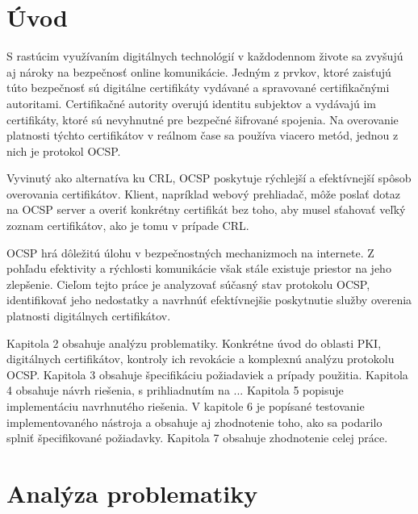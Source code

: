 \documentclass[12pt, twoside]{book}
\begin{document}
\newpage\null\thispagestyle{empty}\newpage

\newpage

\pagestyle{fancy}
\setcounter{page}{1}

\fancyhf{} 
\renewcommand{\headrulewidth}{0pt}
\fancyfoot[C]{\thepage}
\renewcommand\thesection{\arabic{section}}


\section{Úvod}

S rastúcim využívaním digitálnych technológií v každodennom živote sa zvyšujú aj nároky na bezpečnosť online komunikácie. Jedným z prvkov, ktoré zaisťujú túto bezpečnosť sú digitálne certifikáty vydávané a spravované certifikačnými autoritami. Certifikačné autority overujú identitu subjektov a vydávajú im certifikáty, ktoré sú nevyhnutné pre bezpečné šifrované spojenia. Na overovanie platnosti týchto certifikátov v reálnom čase sa používa viacero metód, jednou z nich je protokol OCSP.\cite{certs2}

Vyvinutý ako alternatíva ku CRL, OCSP poskytuje rýchlejší a efektívnejší spôsob overovania certifikátov. Klient, napríklad webový prehliadač, môže poslať dotaz na OCSP server a overiť konkrétny certifikát bez toho, aby musel sťahovať veľký zoznam certifikátov, ako je tomu v prípade CRL.\cite{certs2}

OCSP hrá dôležitú úlohu v bezpečnostných mechanizmoch na internete. Z pohľadu efektivity a rýchlosti komunikácie však stále existuje priestor na jeho zlepšenie. Cieľom tejto práce je analyzovať súčasný stav protokolu OCSP, identifikovať jeho nedostatky a navrhnúť efektívnejšie poskytnutie služby overenia platnosti digitálnych certifikátov.

Kapitola 2 obsahuje analýzu problematiky. Konkrétne úvod do oblasti PKI, digitálnych certifikátov, kontroly ich revokácie a komplexnú analýzu protokolu OCSP. 
Kapitola 3 obsahuje špecifikáciu požiadaviek a prípady použitia. 
Kapitola 4 obsahuje návrh riešenia, s prihliadnutím na ...
Kapitola 5 popisuje implementáciu navrhnutého riešenia.
V kapitole 6 je popísané testovanie implementovaného nástroja a obsahuje aj zhodnotenie toho, ako sa podarilo splniť špecifikované požiadavky. 
Kapitola 7 obsahuje zhodnotenie celej práce.

\newpage
\section{Analýza problematiky}
\end{document}
